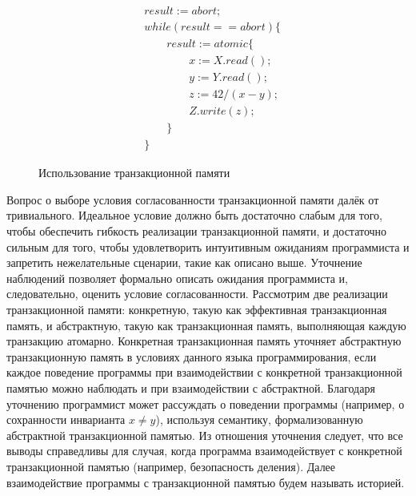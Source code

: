 \begin{figure}[t]
\begin{align*}
&result := abort;\\
&while \left (result == abort \right) \{ \\
& \qquad result := atomic \{ \\
& \qquad \qquad x := X.read(); \\
& \qquad \qquad y := Y.read(); \\ 
& \qquad \qquad z := 42 / (x - y); \\
& \qquad \qquad Z.write(z); \\
& \qquad \} \\
&\}
\end{align*}
\caption{Использование транзакционной памяти}
\label{fig:tm}
\end{figure}
Вопрос о выборе условия согласованности транзакционной памяти далёк от тривиального. Идеальное условие должно быть достаточно слабым для того, чтобы обеспечить гибкость реализации транзакционной памяти, и достаточно сильным для того, чтобы удовлетворить интуитивным ожиданиям программиста и запретить нежелательные сценарии, такие как описано выше. Уточнение наблюдений %
позволяет формально описать ожидания программиста и, следовательно, оценить условие согласованности. Рассмотрим две реализации транзакционной памяти: конкретную, такую как эффективная транзакционная память, и абстрактную, такую как транзакционная память, выполняющая каждую транзакцию атомарно. Конкретная транзакционная память уточняет абстрактную транзакционную память в условиях данного языка программирования, если каждое поведение программы при взаимодействии с конкретной транзакционной памятью можно наблюдать и при взаимодействии с абстрактной. Благодаря уточнению программист может рассуждать о поведении программы (например, о сохранности инварианта $x \neq y$), используя семантику, формализованную абстрактной транзакционной памятью. Из отношения уточнения следует, что все выводы справедливы для случая, когда программа взаимодействует с конкретной транзакционной памятью (например, безопасность деления). Далее взаимодействие программы с транзакционной памятью будем называть историей.    

